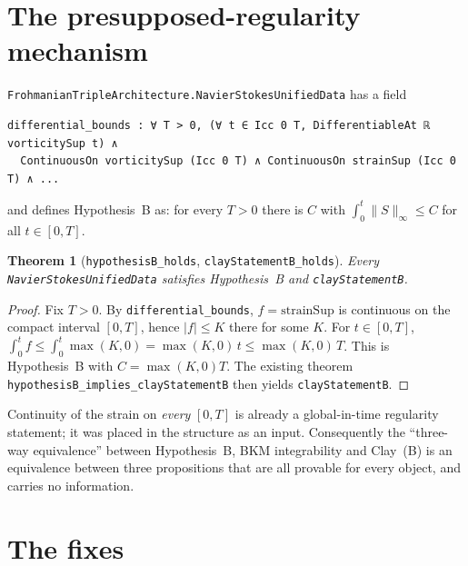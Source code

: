 \documentclass[11pt]{article}
\newtheorem{theorem}{Theorem}
\theoremstyle{definition}
\newcommand{\lean}[1]{\texttt{#1}}
\begin{document}
\section{The presupposed-regularity mechanism}

\lean{FrohmanianTripleArchitecture.NavierStokesUnifiedData} has a field
\begin{lstlisting}
differential_bounds : ∀ T > 0, (∀ t ∈ Icc 0 T, DifferentiableAt ℝ vorticitySup t) ∧
  ContinuousOn vorticitySup (Icc 0 T) ∧ ContinuousOn strainSup (Icc 0 T) ∧ ...
\end{lstlisting}
and defines Hypothesis~B as: for every $T>0$ there is $C$ with
$\int_0^t \|S\|_\infty \le C$ for all $t\in[0,T]$.

\begin{theorem}[\lean{hypothesisB\_holds}, \lean{clayStatementB\_holds}]
Every \lean{NavierStokesUnifiedData} satisfies Hypothesis~B and \lean{clayStatementB}.
\end{theorem}
\begin{proof}
Fix $T>0$. By \lean{differential\_bounds}, $f = \mathrm{strainSup}$ is continuous on
the compact interval $[0,T]$, hence $|f| \le K$ there for some $K$. For $t\in[0,T]$,
$\int_0^t f \le \int_0^t \max(K,0) = \max(K,0)\,t \le \max(K,0)\,T$. This is
Hypothesis~B with $C = \max(K,0)T$. The existing theorem
\lean{hypothesisB\_implies\_clayStatementB} then yields \lean{clayStatementB}.
\end{proof}
Continuity of the strain on \emph{every} $[0,T]$ is already a global-in-time
regularity statement; it was placed in the structure as an input. Consequently the
``three-way equivalence'' between Hypothesis~B, BKM integrability and Clay~(B) is an
equivalence between three propositions that are all provable for every object, and
carries no information.

\section{The fixes}
\end{document}
